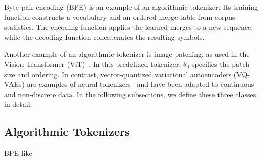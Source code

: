 Byte pair encoding (BPE) is an example of an algorithmic tokenizer. Its training function constructs a vocabulary and an ordered merge table from corpus statistics. The encoding function applies the learned merges to a new sequence, while the decoding function concatenates the resulting symbols.

Another example of an algorithmic tokenizer is image patching, as used in the Vision Transformer (ViT)~\citep{dosovitskiy2021vit}. In this predefined tokenizer, $\theta_0$ specifies the patch size and ordering. In contrast, vector-quantized variational autoencoders (VQ-VAEs) are examples of neural tokenizers~\citep{oord2017vqvae} and have been adapted to continuous and non-discrete data. In the following subsections, we define these three classes in detail.



\subsection{Algorithmic Tokenizers}
\label{sec:algorithmic-tokenizers}

BPE-like




